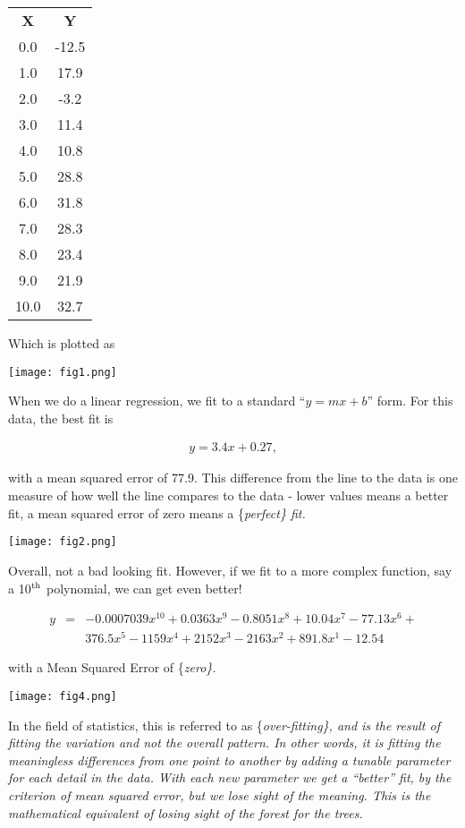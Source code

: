 \documentclass{tufte-book}
\begin{document}
\vspace{.1in}\begin{tabular}{cc}
\toprule
\textbf{X} & \textbf{Y}\\
0.0 & -12.5\\
1.0 & 17.9\\
2.0 & -3.2\\
3.0 & 11.4\\
4.0 & 10.8\\
5.0 & 28.8\\
6.0 & 31.8\\
7.0 & 28.3\\
8.0 & 23.4\\
9.0 & 21.9\\
10.0 & 32.7\\
\bottomrule
\end{tabular}\vspace{.1in}

Which is plotted as

\texttt{[image: fig1.png]}

When we do a linear regression, we fit to a standard ``\(y=mx+b\)''
form. For this data, the best fit is

\begin{eqnarray*}
y=3.4 x + 0.27,
\end{eqnarray*}

with a mean squared error of 77.9. This difference from the line to the
data is one measure of how well the line compares to the data - lower
values means a better fit, a mean squared error of zero means a
\{\em perfect\} fit.

\texttt{[image: fig2.png]}

Overall, not a bad looking fit. However, if we fit to a more complex
function, say a 10\(^{\rm th}\) polynomial, we can get even better!

\begin{eqnarray*}
y&=&-0.0007039 x^{10}  + 0.0363 x^9 - 0.8051 x^8 + 10.04 x^7 - 77.13 x^6 +\\
&& 376.5 x^5- 1159 x^4 + 2152 x^3 - 2163 x^2 + 891.8 x^1 - 12.54
\end{eqnarray*}

with a Mean Squared Error of \{\em zero\}.

\texttt{[image: fig4.png]}

In the field of statistics, this is referred to as \{\em over-fitting\},
and is the result of fitting the variation and not the overall pattern.
In other words, it is fitting the meaningless differences from one point
to another by adding a tunable parameter for each detail in the data.
With each new parameter we get a ``better'' fit, by the criterion of
mean squared error, but we lose sight of the meaning. This is the
mathematical equivalent of losing sight of the forest for the trees.
\end{document}
